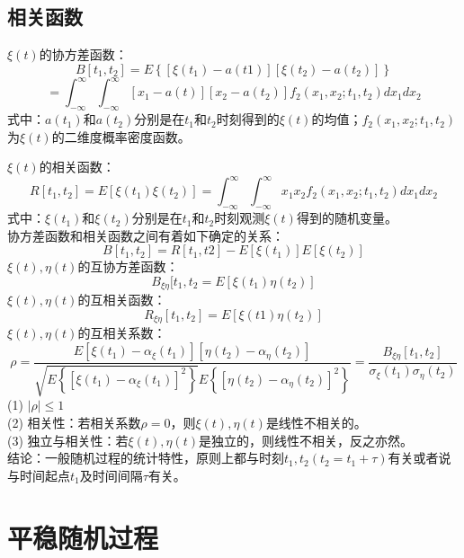 \documentclass[12pt,a4paper,oneside]{ctexart}
\begin{document}
\subsection{相关函数}
\indent $\xi(t)$的协方差函数：
$$
B[t_{1},t_{2}] = E\left\{[\xi(t_{1}) - a(t1)][\xi(t_{2}) - a(t_{2})]\right\} 
$$
$$
= \int_{-\infty }^{\infty } \int_{-\infty}^{\infty}[x_{1} - a(t)][x_{2} - a(t_{2})]f_{2}(x_{1},x_{2};t_{1},t_{2})dx_{1}dx_{2}
$$
\indent 式中：$a(t_{1})$和$a(t_{2})$分别是在$t_{1}$和$t_{2}$时刻得到的$\xi(t)$的均值；$f_{2}(x_{1},x_{2};t_{1},t_{2})$为$\xi(t)$的二维度概率密度函数。

\indent $\xi(t)$的相关函数：
$$
R[t_{1},t_{2}] = E[\xi(t_{1})\xi(t_{2})] = \int_{-\infty}^{\infty}\int_{-\infty}^{\infty}x_{1}x_{2}f_{2}(x_{1},x_{2};t_{1},t_{2})dx_{1}dx_{2}
$$
\indent 式中：$\xi(t_{1})$和$\xi(t_{2})$分别是在$t_{1}$和$t_{2}$时刻观测$\xi(t)$得到的随机变量。\\
\indent 协方差函数和相关函数之间有着如下确定的关系：
$$
B[t_{1},t_{2}] = R[t_{1},t{2}] - E[\xi(t_{1})]E[\xi(t_{2})]
$$
\indent $\xi(t),\eta(t)$的互协方差函数：
$$
B_{\xi\eta}[t_{1},t_{2} = E[\xi(t_{1})\eta(t_{2})]
$$
\indent $\xi(t),\eta(t)$的互相关函数：
$$
R_{\xi\eta}[t_{1},t_{2}] = E[\xi(t1)\eta(t_{2})]
$$
\indent $\xi(t),\eta(t)$的互相关系数：
$$
\rho = \frac{E[\xi(t_{1}) - \alpha_{\xi}(t_{1})][\eta(t_{2}) - \alpha_{\eta}(t_{2})]}{\sqrt{E\left\{[\xi(t_{1}) - \alpha_{\xi}(t_{1})]^{2}\right\}}E\left\{[\eta(t_{2}) - \alpha_{\eta}(t_{2})]^{2}\right\}} = \frac{B_{\xi\eta}[t_{1},t_{2}]}{\sigma_{\xi}(t_{1})\sigma_{\eta}(t_{2})}
$$
\indent (1) $|\rho|\le 1$\\
\indent (2) 相关性：若相关系数$\rho = 0$，则$\xi(t),\eta(t)$是线性不相关的。\\
\indent (3) 独立与相关性：若$\xi(t),\eta(t)$是独立的，则线性不相关，反之亦然。\\
\indent 结论：一般随机过程的统计特性，原则上都与时刻$t_{1},t_{2}(t_{2} = t_{1} + \tau)$有关或者说与时间起点$t_{1}$及时间间隔$\tau$有关。
\section{平稳随机过程}
\end{document}
